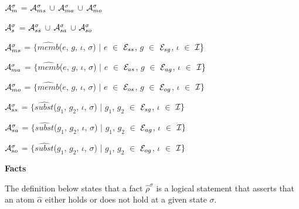 \documentclass[11pt]{report}
\newenvironment{vquote}
{
  \begin{list}{}{\leftmargin 1em}\item[]
}
{
  \end{list}
}
\begin{document}
\begin{itemize}
\begin{vquote}
                ${\cal A}^{\sigma}_{m}$ =
                  ${\cal A}^{\sigma}_{ms}$ $\cup$
                  ${\cal A}^{\sigma}_{ma}$ $\cup$
                  ${\cal A}^{\sigma}_{mo}$
    
                ${\cal A}^{\sigma}_{s}$ =
                  ${\cal A}^{\sigma}_{ss}$ $\cup$
                  ${\cal A}^{\sigma}_{sa}$ $\cup$
                  ${\cal A}^{\sigma}_{so}$
    
                ${\cal A}^{\sigma}_{ms}$ =
                  $\{\hat{memb}$($e$, $g$, $\iota$, $\sigma$) $\mid$
                  $e$ $\in$ ${\cal E}_{ss}$,
                  $g$ $\in$ ${\cal E}_{sg}$,
                  $\iota$ $\in$ ${\cal I}\}$
    
                ${\cal A}^{\sigma}_{ma}$ =
                  $\{\hat{memb}$($e$, $g$, $\iota$, $\sigma$) $\mid$
                  $e$ $\in$ ${\cal E}_{as}$,
                  $g$ $\in$ ${\cal E}_{ag}$,
                  $\iota$ $\in$ ${\cal I}\}$
    
                ${\cal A}^{\sigma}_{mo}$ =
                  $\{\hat{memb}$($e$, $g$, $\iota$, $\sigma$) $\mid$
                  $e$ $\in$ ${\cal E}_{os}$,
                  $g$ $\in$ ${\cal E}_{og}$,
                  $\iota$ $\in$ ${\cal I}\}$
    
                ${\cal A}^{\sigma}_{ss}$ =
                  $\{\hat{subst}$($g_{1}$, $g_{2}$, $\iota$, $\sigma$) $\mid$
                  $g_{1}$, $g_{2}$ $\in$ ${\cal E}_{sg}$,
                  $\iota$ $\in$ ${\cal I}\}$
    
                ${\cal A}^{\sigma}_{sa}$ =
                  $\{\hat{subst}$($g_{1}$, $g_{2}$, $\iota$, $\sigma$) $\mid$
                  $g_{1}$, $g_{2}$ $\in$ ${\cal E}_{ag}$,
                  $\iota$ $\in$ ${\cal I}\}$
    
                ${\cal A}^{\sigma}_{so}$ =
                  $\{\hat{subst}$($g_{1}$, $g_{2}$, $\iota$, $\sigma$) $\mid$
                  $g_{1}$, $g_{2}$ $\in$ ${\cal E}_{og}$,
                  $\iota$ $\in$ ${\cal I}\}$
              \end{vquote}
          
            \item
              {\bf Facts}

              The definition below states that a fact $\hat{\rho}^\sigma$ is a
              logical statement that asserts that an atom $\hat{\alpha}$ either
              holds or does not hold at a given state $\sigma$.


\end{itemize}
\end{document}
